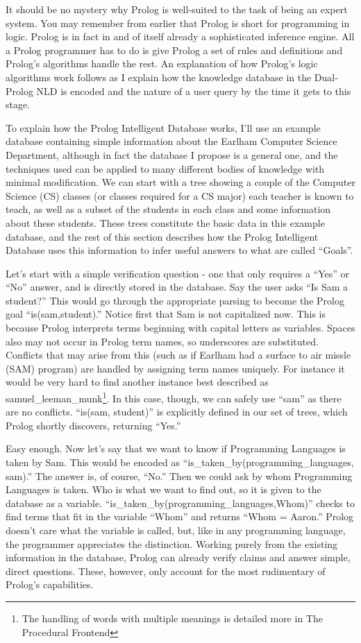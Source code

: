 \documentclass[12pt]{article}
\begin{document}
It should be no mystery why Prolog is well-suited to the task of being an expert system. You may remember from earlier that Prolog is short for programming in logic. Prolog is in fact in and of itself already a sophisticated inference engine. All a Prolog programmer has to do is give Prolog a set of rules and definitions and Prolog's algorithms handle the rest. An explanation of how Prolog's logic algorithms work follows as I explain how the knowledge database in the Dual-Prolog NLD is encoded and the nature of a user query by the time it gets to this stage.

To explain how the Prolog Intelligent Database works, I'll use an example database containing simple information about the Earlham Computer Science Department, although in fact the database I propose is a general one, and the techniques used can be applied to many different bodies of knowledge with minimal modification. We can start with a tree showing a couple of the Computer Science (CS) classes (or classes required for a CS major) each teacher is known to teach, as well as a subset of the students in each class and some information about these students. These trees constitute the basic data in this example database, and the rest of this section describes how the Prolog Intelligent Database uses this information to infer useful answers to what are called ``Goals''. 

Let's start with a simple verification question - one that only requires a ``Yes'' or ``No'' answer, and is directly stored in the database. Say the user asks ``Is Sam a student?'' This would go through the appropriate parsing to become the Prolog goal ``is(sam,student).'' Notice first that Sam is not capitalized now. This is because Prolog interprets terms beginning with capital letters as variables. Spaces also may not occur in Prolog term names, so underscores are substituted. Conflicts that may arise from this (such as if Earlham had a surface to air missle (SAM) program) are handled by assigning term names uniquely. For instance it would be very hard to find another instance best described as samuel_leeman_munk\footnote{The handling of words with multiple meanings is detailed more in The Procedural Frontend}. In this case, though, we can safely use ``sam'' as there are no conflicts. ``is(sam, student)'' is explicitly defined in our set of trees, which Prolog shortly discovers, returning ``Yes.''

Easy enough. Now let's say that we want to know if Programming Languages is taken by Sam. This would be encoded as ``is\_taken\_by(programming_languages, sam).'' The answer is, of course, ``No.''  Then we could ask by whom Programming Languages is taken. Who is what we want to find out, so it is given to the database as a variable. ``is_taken_by(programming_languages,Whom)'' checks to find terms that fit in the variable ``Whom'' and returns ``Whom = Aaron.'' Prolog doesn't care what the variable is called, but, like in any programming language, the programmer appreciates the distinction. Working purely from the existing information in the database, Prolog can already verify claims and answer simple, direct questions. These, however, only account for the most rudimentary of Prolog's capabilities.
\end{document}

